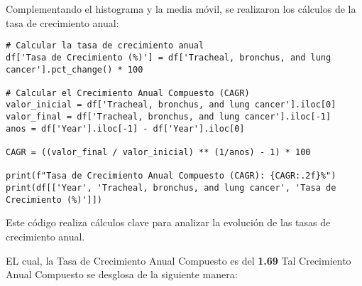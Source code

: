 Complementando el histograma y la media móvil, se realizaron los cálculos de la tasa de crecimiento anual:


\begin{lstlisting}
# Calcular la tasa de crecimiento anual
df['Tasa de Crecimiento (%)'] = df['Tracheal, bronchus, and lung cancer'].pct_change() * 100

# Calcular el Crecimiento Anual Compuesto (CAGR)
valor_inicial = df['Tracheal, bronchus, and lung cancer'].iloc[0]
valor_final = df['Tracheal, bronchus, and lung cancer'].iloc[-1]
anos = df['Year'].iloc[-1] - df['Year'].iloc[0]

CAGR = ((valor_final / valor_inicial) ** (1/anos) - 1) * 100

print(f"Tasa de Crecimiento Anual Compuesto (CAGR): {CAGR:.2f}%")
print(df[['Year', 'Tracheal, bronchus, and lung cancer', 'Tasa de Crecimiento (%)']])
\end{lstlisting}

Este código realiza cálculos clave para analizar la evolución de las tasas de crecimiento anual. 

EL cual, la Tasa de Crecimiento Anual Compuesto es del \textbf{1.69}%
Tal Crecimiento Anual Compuesto se desglosa de la siguiente manera: 

